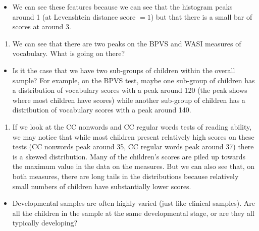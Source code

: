 \documentclass[
  letterpaper,
  DIV=11,
  numbers=noendperiod]{scrreprt}
\providecommand{\tightlist}{%
  \setlength{\itemsep}{0pt}\setlength{\parskip}{0pt}}\usepackage{longtable,booktabs,array}
\begin{document}
\begin{itemize}
\tightlist
\item
  We can see these features because we can see that the histogram peaks
  around 1 (at Levenshtein distance score \(= 1\)) but that there is a
  small bar of scores at around 3.
\end{itemize}

\begin{enumerate}
\def\labelenumi{\arabic{enumi}.}
\setcounter{enumi}{1}
\tightlist
\item
  We can see that there are two peaks on the BPVS and WASI measures of
  vocabulary. What is going on there?
\end{enumerate}

\begin{itemize}
\tightlist
\item
  Is it the case that we have two sub-groups of children within the
  overall sample? For example, on the BPVS test, maybe one sub-group of
  children has a distribution of vocabulary scores with a peak around
  120 (the peak shows where most children have scores) while another
  sub-group of children has a distribution of vocabulary scores with a
  peak around 140.
\end{itemize}

\begin{enumerate}
\def\labelenumi{\arabic{enumi}.}
\setcounter{enumi}{2}
\tightlist
\item
  If we look at the CC nonwords and CC regular words tests of reading
  ability, we may notice that while most children present relatively
  high scores on these tests (CC nonwords peak around 35, CC regular
  words peak around 37) there is a skewed distribution. Many of the
  children's scores are piled up towards the maximum value in the data
  on the measures. But we can also see that, on both measures, there are
  long tails in the distributions because relatively small numbers of
  children have substantially lower scores.
\end{enumerate}

\begin{itemize}
\tightlist
\item
  Developmental samples are often highly varied (just like clinical
  samples). Are all the children in the sample at the same developmental
  stage, or are they all typically developing?
\end{itemize}
\end{document}
